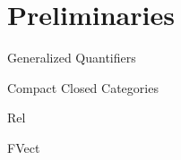 \section{Preliminaries}
\label{prelim}


Generalized Quantifiers


Compact Closed Categories


Rel

FVect